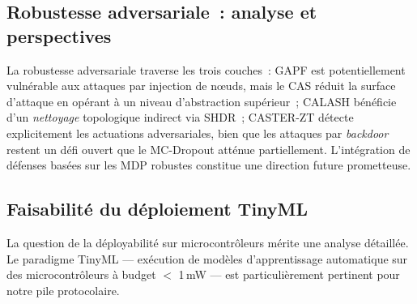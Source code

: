 \subsection{Robustesse adversariale~: analyse et perspectives}

La robustesse adversariale traverse les trois couches~: GAPF est potentiellement vulnérable aux attaques par injection de n\oe{}uds, mais le CAS réduit la surface d'attaque en opérant à un niveau d'abstraction supérieur~; CALASH bénéficie d'un \emph{nettoyage} topologique indirect via SHDR~; CASTER-ZT détecte explicitement les actuations adversariales, bien que les attaques par \emph{backdoor} \cite{Kiourti2021BackdoorDRL} restent un défi ouvert que le MC-Dropout atténue partiellement. L'intégration de défenses basées sur les MDP robustes \cite{Iyengar2005RobustMDP} constitue une direction future prometteuse.

\subsection{Faisabilité du déploiement TinyML}

La question de la déployabilité sur microcontrôleurs mérite une analyse détaillée. Le paradigme TinyML \cite{Warden2020TinyML} --- exécution de modèles d'apprentissage automatique sur des microcontrôleurs à budget $<$ 1\,mW --- est particulièrement pertinent pour notre pile protocolaire.

\begin{table}[htbp]
\centering
\caption{Analyse de déployabilité TinyML des trois cadres proposés.}
\label{tab:tinyml-deploy}
\end{table}

